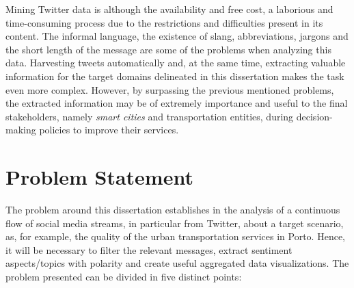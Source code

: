 Mining Twitter data is although the availability and free cost, a laborious and time-consuming process due to the restrictions and difficulties present in its content. The informal language, the existence of slang, abbreviations, jargons and the short length of the message are some of the problems when analyzing this data. Harvesting tweets automatically and, at the same time, extracting valuable information for the target domains delineated in this dissertation makes the task even more complex. However, by surpassing the previous mentioned problems, the extracted information may be of extremely importance and useful to the final stakeholders, namely \textit{smart cities} and transportation entities, during decision-making policies to improve their services.

\section{Problem Statement}\label{sec:problem}
The problem around this dissertation establishes in the analysis of a continuous flow of social media streams, in particular from Twitter, about a target scenario, as, for example, the quality of the urban transportation services in Porto. Hence, it will be necessary to filter the relevant messages, extract sentiment aspects/topics with polarity and create useful aggregated data visualizations. The problem presented can be divided in five distinct points:

